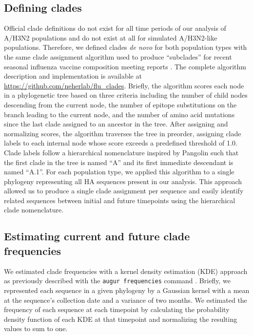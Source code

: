 \documentclass[9pt,lineno]{elife}
\begin{document}
\subsection{Defining clades}

Official clade definitions do not exist for all time periods of our analysis of A/H3N2 populations and do not exist at all for simulated A/H3N2-like populations.
Therefore, we defined clades \emph{de novo} for both population types with the same clade assignment algorithm used to produce ``subclades'' for recent seasonal influenza vaccine composition meeting reports \citep{Huddleston2024}.
The complete algorithm description and implementation is available at \url{https://github.com/neherlab/flu_clades}.
Briefly, the algorithm scores each node in a phylogenetic tree based on three criteria including the number of child nodes descending from the current node, the number of epitope substitutions on the branch leading to the current node, and the number of amino acid mutations since the last clade assigned to an ancestor in the tree.
After assigning and normalizing scores, the algorithm traverses the tree in preorder, assigning clade labels to each internal node whose score exceeds a predefined threshold of 1.0.
Clade labels follow a hierarchical nomenclature inspired by Pangolin \citep{OToole2021} such that the first clade in the tree is named ``A'' and its first immediate descendant is named ``A.1''.
For each population type, we applied this algorithm to a single phylogeny representing all HA sequences present in our analysis.
This approach allowed us to produce a single clade assignment per sequence and easily identify related sequences between initial and future timepoints using the hierarchical clade nomenclature.

\subsection{Estimating current and future clade frequencies}

We estimated clade frequencies with a kernel density estimation (KDE) approach as previously described \citep{Huddleston2020} with the \texttt{augur frequencies} command \citep{Huddleston2021}.
Briefly, we represented each sequence in a given phylogeny by a Gaussian kernel with a mean at the sequence's collection date and a variance of two months.
We estimated the frequency of each sequence at each timepoint by calculating the probability density function of each KDE at that timepoint and normalizing the resulting values to sum to one.
\end{document}
